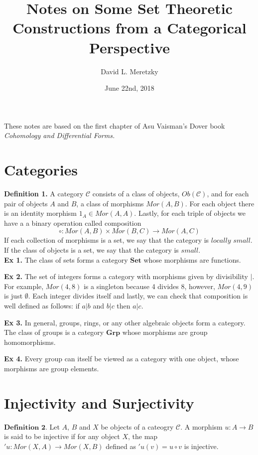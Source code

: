 \documentclass{article}
\title{ \vspace{-10ex} %
Notes on Some Set Theoretic Constructions from a Categorical Perspective
}
\author{David L. Meretzky
}
\date{%
June 22nd, 2018
}
\theoremstyle{problemstyle}
\begin{document}
\maketitle

These notes are based on the first chapter of Asu Vaisman's Dover book \textit{Cohomology and Differential Forms.}

\section{Categories}

\textbf{Definition 1.} A category $\mathcal{C}$ consists of a class of objects, $Ob(\mathcal{C})$, and for each pair of objects $A$ and $B$, a class of morphisms $Mor(A,B)$. For each object there is an identity morphism $1_A \in Mor(A,A)$.  Lastly, for each triple of objects we have a a binary operation called composition $$\circ: Mor(A,B) \times Mor(B,C) \rightarrow Mor(A,C)$$
If each collection of morphisms is a set, we say that the category is $locally$ $small$. If the class of objects is a set, we say that the category is $small$.\\

\textbf{Ex 1.} The class of sets forms a category $\textbf{Set}$ whose morphisms are functions. 

\textbf{Ex 2.} The set of integers forms a category with morphisms given by divisibility $|$. For example, $Mor(4,8)$  is a singleton because 4 divides 8, however, $Mor(4,9)$ is just $\emptyset$. Each integer divides itself and lastly, we can check that composition is well defined as follows: if $a | b$ and $b | c$ then $a|c$. 

\textbf{Ex 3.} In general, groups, rings, or any other algebraic objects form a category. The class of groups is a category $\textbf{Grp}$ whose morphisms are group homomorphisms. 

\textbf{Ex 4.} Every group can itself be viewed as a category with one object, whose morphisms are  group elements.

\section{Injectivity and Surjectivity}

$\textbf{Definition 2.}$ Let $A$, $B$ and $X$ be objects of a cateogry $\mathcal{C}$. A morphism $u: A \rightarrow B$ is said to be injective if for any object $X$, the map $'u: Mor(X,A) \rightarrow Mor(X,B)$ defined as $'u(v) = u\circ v$ is injective.\\ 
\end{document}

